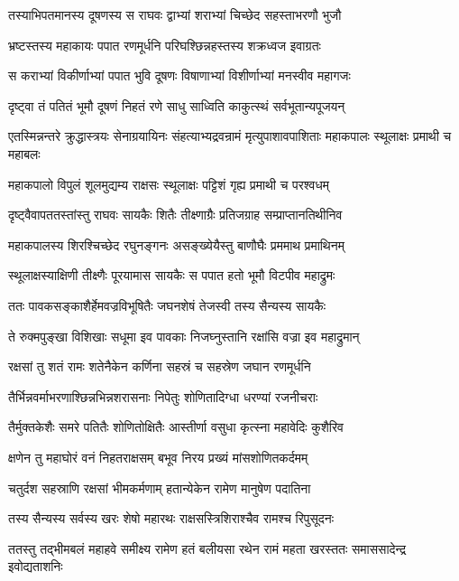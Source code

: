 \twolineshloka
{तस्याभिपतमानस्य दूषणस्य स राघवः}
{द्वाभ्यां शराभ्यां चिच्छेद सहस्ताभरणौ भुजौ} %

\twolineshloka
{भ्रष्टस्तस्य महाकायः पपात रणमूर्धनि}
{परिघश्छिन्नहस्तस्य शक्रध्वज इवाग्रतः} %

\twolineshloka
{स कराभ्यां विकीर्णाभ्यां पपात भुवि दूषणः}
{विषाणाभ्यां विशीर्णाभ्यां मनस्वीव महागजः} %

\twolineshloka
{दृष्ट्वा तं पतितं भूमौ दूषणं निहतं रणे}
{साधु साध्विति काकुत्स्थं सर्वभूतान्यपूजयन्} %

\threelineshloka
{एतस्मिन्नन्तरे क्रुद्धास्त्रयः सेनाग्रयायिनः}
{संहत्याभ्यद्रवन्रामं मृत्युपाशावपाशिताः}
{महाकपालः स्थूलाक्षः प्रमाथी च महाबलः} %

\twolineshloka
{महाकपालो विपुलं शूलमुद्यम्य राक्षसः}
{स्थूलाक्षः पट्टिशं गृह्य प्रमाथी च परश्वधम्} %

\twolineshloka
{दृष्ट्वैवापततस्तांस्तु राघवः सायकैः शितैः}
{तीक्ष्णाग्रैः प्रतिजग्राह सम्प्राप्तानतिथीनिव} %

\twolineshloka
{महाकपालस्य शिरश्चिच्छेद रघुनङ्गनः}
{असङ्ख्येयैस्तु बाणौघैः प्रममाथ प्रमाथिनम्} %

\twolineshloka
{स्थूलाक्षस्याक्षिणी तीक्ष्णैः पूरयामास सायकैः}
{स पपात हतो भूमौ विटपीव महाद्रुमः} %

\twolineshloka
{ततः पावकसङ्काशैर्हेमवज्रविभूषितैः}
{जघनशेषं तेजस्वी तस्य सैन्यस्य सायकैः} %

\twolineshloka
{ते रुक्मपुङ्खा विशिखाः सधूमा इव पावकाः}
{निजघ्नुस्तानि रक्षांसि वज्रा इव महाद्रुमान्} %

\twolineshloka
{रक्षसां तु शतं रामः शतेनैकेन कर्णिना}
{सहस्रं च सहस्रेण जघान रणमूर्धनि} %

\twolineshloka
{तैर्भिन्नवर्माभरणाश्छिन्नभिन्नशरासनाः}
{निपेतुः शोणितादिग्धा धरण्यां रजनीचराः} %

\twolineshloka
{तैर्मुक्तकेशैः समरे पतितैः शोणितोक्षितैः}
{आस्तीर्णा वसुधा कृत्स्ना महावेदिः कुशैरिव} %

\twolineshloka
{क्षणेन तु महाघोरं वनं निहतराक्षसम्}
{बभूव निरय प्रख्यं मांसशोणितकर्दमम्} %

\twolineshloka
{चतुर्दश सहस्राणि रक्षसां भीमकर्मणाम्}
{हतान्येकेन रामेण मानुषेण पदातिना} %

\twolineshloka
{तस्य सैन्यस्य सर्वस्य खरः शेषो महारथः}
{राक्षसस्त्रिशिराश्चैव रामश्च रिपुसूदनः} %

\fourlineindentedshloka
{ततस्तु तद्भीमबलं महाहवे}
{समीक्ष्य रामेण हतं बलीयसा}
{रथेन रामं महता खरस्ततः}
{समाससादेन्द्र इवोद्यताशनिः} %


